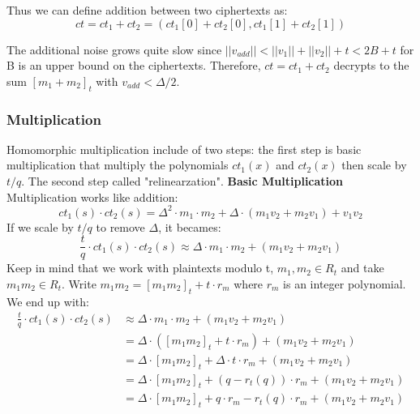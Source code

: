 \documentclass[A4paper,12pt]{article}
\begin{document}
Thus we can define addition between two ciphertexts as:
\begin{equation*}
ct = ct_1 + ct_2 = (ct_1[0] + ct_2[0], ct_1[1] + ct_2[1])
\end{equation*}

The additional noise grows quite slow since $||v_{add}|| < ||v_1|| + ||v_2|| + t < 2B + t$ for B is an upper bound on the ciphertexts. Therefore, 	$ct = ct_1 + ct_2$ decrypts to the sum $[m_1 + m_2]_t$ with $v_{add} < \Delta / 2$. 
	\subsubsection{Multiplication}
Homomorphic multiplication include of two steps: the first step is basic multiplication that multiply the polynomials $ct_1(x)$ and $ct_2(x)$ then scale by $t/q$. The second step called "relinearzation". \newline
\textbf{Basic Multiplication}
Multiplication works like addition:
\begin{equation*}
ct_1(s) \cdot ct_2(s) = \Delta^2 \cdot m_1 \cdot m_2 + \Delta \cdot ( m_1v_2 + m_2v_1) + v_1v_2
\end{equation*}
If we scale by $t/q$ to remove $\Delta$, it becames:
\begin{equation*}
\frac{t}{q} \cdot ct_1(s) \cdot ct_2(s) \approx \Delta \cdot m_1 \cdot m_2 +( m_1v_2 + m_2v_1)
\end{equation*}
Keep in mind that we work with plaintexts modulo t, $m_1, m_2 \in R_t$ and take $m_1m_2 \in R_t$. Write $m_1m_2 = [m_1m_2]_t + t \cdot r_m$ where $r_m$ is an integer polynomial.
We end up with:
\begin{equation}\label{eq:mul1}
\begin{aligned}
\frac{t}{q} \cdot ct_1(s) \cdot ct_2(s) &\approx \Delta \cdot m_1 \cdot m_2 +( m_1v_2 + m_2v_1)\\
&= \Delta \cdot ([m_1m_2]_t + t \cdot r_m) + (m_1v_2 + m_2v_1)\\
&= \Delta \cdot [m_1m_2]_t + \Delta \cdot t \cdot r_m + (m_1v_2 + m_2v_1)\\
&= \Delta \cdot [m_1m_2]_t + (q - r_t(q))\cdot r_m + (m_1v_2 + m_2v_1)\\
&= \Delta \cdot [m_1m_2]_t + q \cdot r_m - r_t(q) \cdot r_m + (m_1v_2 + m_2v_1)\\
\end{aligned}
\end{equation}
\end{document}

